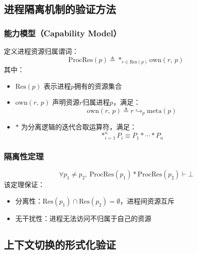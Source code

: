\subsection{进程隔离机制的验证方法}
\label{subsec:proc-isolation}

\subsubsection{能力模型（Capability Model）}
\label{subsubsec:capability-model}

\noindent 定义进程资源归属谓词：
\begin{equation}
\label{eq:proc-res}
\mathrm{ProcRes}(p) \triangleq \ast_{r \in \mathrm{Res}(p)} \mathrm{own}(r,\,p)
\end{equation}
\noindent 其中：
\begin{itemize}
    \item $\mathrm{Res}(p)$ 表示进程$p$拥有的资源集合
    \item $\mathrm{own}(r,\,p)$ 声明资源$r$归属进程$p$，满足：
        \begin{equation}
        \mathrm{own}(r,\,p) \triangleq r \hookrightarrow_p \mathrm{meta}(p)
        \end{equation}
    \item $\ast$ 为分离逻辑的迭代合取运算符，满足：
        \begin{equation}
        \ast_{i=1}^n P_i \equiv P_1 \ast \cdots \ast P_n
        \end{equation}
\end{itemize}

\subsubsection{隔离性定理}
\begin{equation}
\label{eq:noninterference}
\forall p_1 \neq p_2,\ \mathrm{ProcRes}(p_1) \ast \mathrm{ProcRes}(p_2) \vdash \bot
\end{equation}
\noindent 该定理保证：
\begin{itemize}
    \item 分离性：$\mathrm{Res}(p_1) \cap \mathrm{Res}(p_2) = \emptyset$，进程间资源互斥
    \item 无干扰性：进程无法访问不归属于自己的资源
\end{itemize}

\subsection{上下文切换的形式化验证}
\label{subsec:context-verification}

